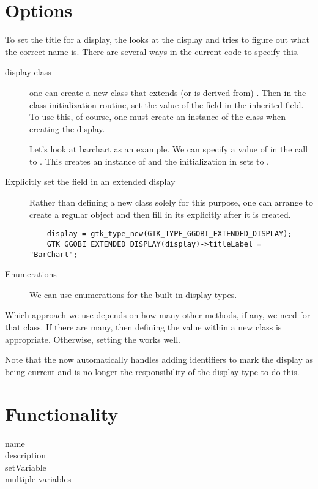 \documentclass{article}
\begin{document}
\section{Options}
To set the title for a display, the 
looks at the display and tries to figure out
what the correct name is.
There are several ways in the current code to specify this.
\begin{description}
\item[display class]
one can create a new class that extends (or is derived from)
.
Then in the class initialization routine, set the value of
the  field in the
inherited  field.
To use this, of course, one must create an instance of
the class when creating the display.

Let's look at barchart as an example.  We can specify a value of
 in the call to
. This creates an instance of
 and the initialization in 
sets  to .


\item[Explicitly set the  field in an extended
  display]
Rather than defining a new class solely for this purpose, 
one can arrange to create a regular
 object
and then fill in its 
explicitly after it is created.
\begin{verbatim}
    display = gtk_type_new(GTK_TYPE_GGOBI_EXTENDED_DISPLAY);
    GTK_GGOBI_EXTENDED_DISPLAY(display)->titleLabel = "BarChart";
\end{verbatim}

\item[Enumerations]
We can use enumerations for the built-in display types.
\end{description}

Which approach we use depends on how many other methods, 
if any, we need for that class. If there are many, then
defining the value within a new class is appropriate.
Otherwise, setting the  works well. 


Note that the  now automatically handles adding
identifiers to mark the display as being current and is no longer the
responsibility of the display type to do this.






\section{Functionality}
\begin{description}
\item[name] 
\item[description]
\item[setVariable]
\item[multiple variables]
\end{description}
\end{document}
